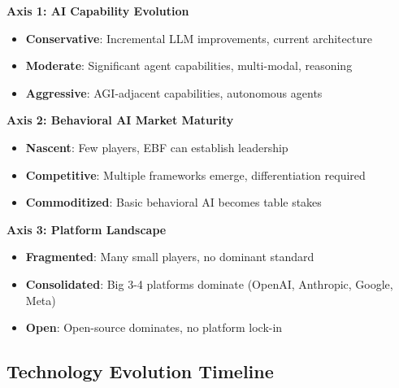 \begin{tcolorbox}[colback=blue!5!white, colframe=blue!75!black,
    title=Three Axes of Technological Uncertainty]

\textbf{Axis 1: AI Capability Evolution}
\begin{itemize}[nosep]
\item \textbf{Conservative}: Incremental LLM improvements, current architecture
\item \textbf{Moderate}: Significant agent capabilities, multi-modal, reasoning
\item \textbf{Aggressive}: AGI-adjacent capabilities, autonomous agents
\end{itemize}

\textbf{Axis 2: Behavioral AI Market Maturity}
\begin{itemize}[nosep]
\item \textbf{Nascent}: Few players, EBF can establish leadership
\item \textbf{Competitive}: Multiple frameworks emerge, differentiation required
\item \textbf{Commoditized}: Basic behavioral AI becomes table stakes
\end{itemize}

\textbf{Axis 3: Platform Landscape}
\begin{itemize}[nosep]
\item \textbf{Fragmented}: Many small players, no dominant standard
\item \textbf{Consolidated}: Big 3-4 platforms dominate (OpenAI, Anthropic, Google, Meta)
\item \textbf{Open}: Open-source dominates, no platform lock-in
\end{itemize}

\end{tcolorbox}


\subsection{Technology Evolution Timeline}

